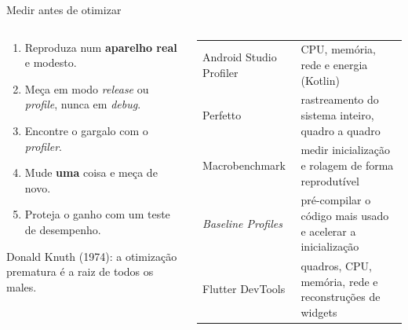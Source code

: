 \documentclass[aspectratio=169,10pt]{beamer}
\begin{document}
\begin{frame}{Medir antes de otimizar}
  \begin{columns}[T]
    \begin{column}{0.5\textwidth}
      \begin{conceito}[O método]
        \begin{enumerate}
          \item Reproduza num \textbf{aparelho real} e modesto.
          \item Meça em modo \emph{release} ou \emph{profile}, nunca em \emph{debug}.
          \item Encontre o gargalo com o \emph{profiler}.
          \item Mude \textbf{uma} coisa e meça de novo.
          \item Proteja o ganho com um teste de desempenho.
        \end{enumerate}
      \end{conceito}
      \begin{historia}
        Donald Knuth (1974): a otimização prematura é a raiz de todos os males.
      \end{historia}
    \end{column}
    \begin{column}{0.48\textwidth}
      \scriptsize
      \begin{tabularx}{\linewidth}{@{}l L@{}}
        \toprule
         &  \\
        \midrule
        Android Studio Profiler & CPU, memória, rede e energia (Kotlin) \\
        Perfetto & rastreamento do sistema inteiro, quadro a quadro \\
        Macrobenchmark & medir inicialização e rolagem de forma reprodutível \\
        \emph{Baseline Profiles} & pré-compilar o código mais usado e acelerar a inicialização \\
        Flutter DevTools & quadros, CPU, memória, rede e reconstruções de widgets \\
        \bottomrule
      \end{tabularx}
    \end{column}
  \end{columns}
\end{frame}
\end{document}
